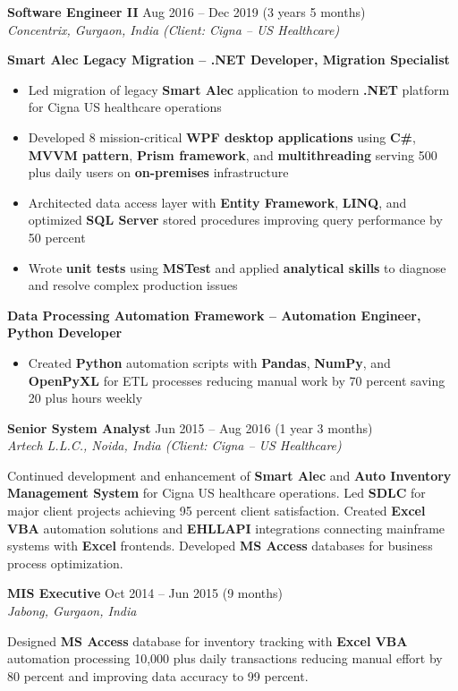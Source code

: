 \documentclass[10pt,a4paper]{article}
\newcommand{\jobentry}[3]{%
    \vspace{4pt}
    {\normalsize\bfseries #1} \hfill #2\\
    \textit{#3}
}
\begin{document}
\jobentry{Software Engineer II}{Aug 2016 -- Dec 2019 (3 years 5 months)}{Concentrix, Gurgaon, India (Client: Cigna -- US Healthcare)}

\textbf{Smart Alec Legacy Migration -- .NET Developer, Migration Specialist}
\begin{itemize}
    \item Led migration of legacy \textbf{Smart Alec} application to modern \textbf{.NET} platform for Cigna US healthcare operations
    \item Developed 8 mission-critical \textbf{WPF desktop applications} using \textbf{C\#}, \textbf{MVVM pattern}, \textbf{Prism framework}, and \textbf{multithreading} serving 500 plus daily users on \textbf{on-premises} infrastructure
    \item Architected data access layer with \textbf{Entity Framework}, \textbf{LINQ}, and optimized \textbf{SQL Server} stored procedures improving query performance by 50 percent
    \item Wrote \textbf{unit tests} using \textbf{MSTest} and applied \textbf{analytical skills} to diagnose and resolve complex production issues
\end{itemize}

\textbf{Data Processing Automation Framework -- Automation Engineer, Python Developer}
\begin{itemize}
    \item Created \textbf{Python} automation scripts with \textbf{Pandas}, \textbf{NumPy}, and \textbf{OpenPyXL} for ETL processes reducing manual work by 70 percent saving 20 plus hours weekly
\end{itemize}

\jobentry{Senior System Analyst}{Jun 2015 -- Aug 2016 (1 year 3 months)}{Artech L.L.C., Noida, India (Client: Cigna -- US Healthcare)}

Continued development and enhancement of \textbf{Smart Alec} and \textbf{Auto Inventory Management System} for Cigna US healthcare operations. Led \textbf{SDLC} for major client projects achieving 95 percent client satisfaction. Created \textbf{Excel VBA} automation solutions and \textbf{EHLLAPI} integrations connecting mainframe systems with \textbf{Excel} frontends. Developed \textbf{MS Access} databases for business process optimization.

\jobentry{MIS Executive}{Oct 2014 -- Jun 2015 (9 months)}{Jabong, Gurgaon, India}

Designed \textbf{MS Access} database for inventory tracking with \textbf{Excel VBA} automation processing 10,000 plus daily transactions reducing manual effort by 80 percent and improving data accuracy to 99 percent.
\end{document}
